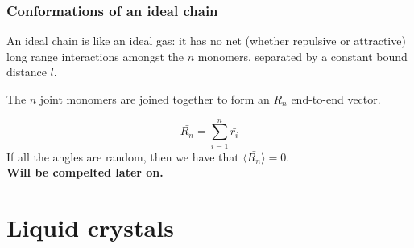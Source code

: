 \documentclass[../phys-f308.tex]{subfiles}
\begin{document}
    \section{Conformations of an ideal chain}

    \begin{definition}
        An ideal chain is like an ideal gas: it has no net (whether repulsive or attractive) long range interactions amongst the $n$ monomers, separated by a constant bound distance $l$.
    \end{definition}

    The $n$ joint monomers are joined together to form an $R_n$ end-to-end vector.

    \begin{equation}
        \bar{R_n} = \sum_{i=1}^n\bar{r_i}
    \end{equation}
    If all the angles are random, then we have that $\langle\bar{R_n}\rangle = 0$.\\

    \color{red}\textbf{Will be compelted later on.}\color{black}

    \part{Liquid crystals}
\end{document}
